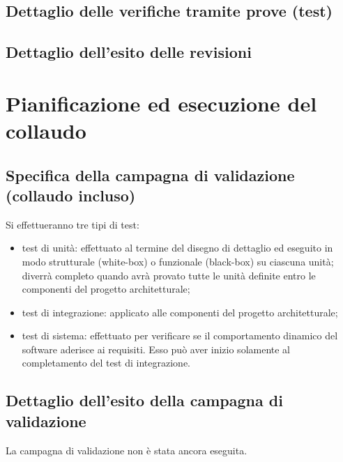 \section{Dettaglio delle verifiche tramite prove (test)}

\section{Dettaglio dell'esito delle revisioni}


\chapter{Pianificazione ed esecuzione del \\collaudo}
\thispagestyle{fancy} %

\section{Specifica della campagna di validazione \\(collaudo incluso)}
Si effettueranno tre tipi di test:

\begin{itemize}
	\item test di unit\`a: effettuato al termine del disegno di dettaglio ed eseguito
in modo strutturale (white-box) o funzionale (black-box) su ciascuna unit\`a; diverr\`a completo quando avr\`a provato tutte le unit\`a definite entro le
componenti del progetto architetturale;
	\item test di integrazione: applicato alle componenti del progetto
architetturale;
	\item test di sistema: effettuato per verificare se il comportamento dinamico
del software aderisce ai requisiti. Esso pu\`o aver inizio solamente al
completamento del test di integrazione.
\end{itemize}

\section{Dettaglio dell'esito della campagna di validazione}
La campagna di validazione non \`e stata ancora eseguita.

\listoftables
{}
\listoffigures
{}




